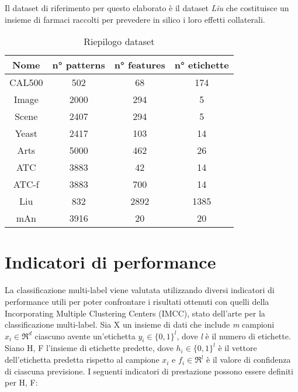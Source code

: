 Il dataset di riferimento per questo elaborato è il dataset \textit{Liu} che costituisce un insieme di farmaci raccolti per prevedere in silico i loro effetti collaterali.

\vspace{0.25cm}

\begin{table}[h!]
	\begin{center}
	\begin{tabular}{|| c | c | c | c ||} 
 	\hline
	\textbf{Nome} & \textbf{n° patterns} & \textbf{n° features} & \textbf{n° etichette} \\
	\hline
	CAL500 & 502 & 68 & 174 \\
	\hline
	Image & 2000 & 294 & 5 \\
	\hline
	Scene & 2407 & 294 & 5 \\
	\hline
	Yeast & 2417 & 103 & 14 \\
	\hline
	Arts & 5000 & 462 & 26 \\
	\hline
	ATC & 3883 & 42 & 14 \\
	\hline
	ATC-f & 3883 & 700 & 14 \\
	\hline
	Liu & 832 & 2892 & 1385 \\
	\hline
	mAn & 3916 & 20 & 20 \\
	\hline
	\end{tabular}
	\caption{Riepilogo dataset}
	\label{Tabella 1}
	\end{center}
\end{table}

\newpage
\section{Indicatori di performance}
La classificazione multi-label viene valutata utilizzando diversi indicatori di performance utili per poter confrontare i risultati ottenuti con quelli della Incorporating Multiple Clustering Centers (IMCC), stato dell'arte per la classificazione multi-label. Sia X un insieme di dati che include \textit{m} campioni $x_{i} \in \Re^{d}$ ciascuno avente un'etichetta $y_{i} \in \{0,1\}^{l}$, dove \textit{l} è il numero di etichette. Siano H, F l'insieme di etichette predette, dove $h_{i} \in \{0,1\}^l$ è il vettore dell'etichetta predetta rispetto al campione $x_{i}$ e $f_{i} \in \Re^{l}$ è il valore di confidenza di ciascuna previsione.
I seguenti indicatori di prestazione possono essere definiti per H, F:

